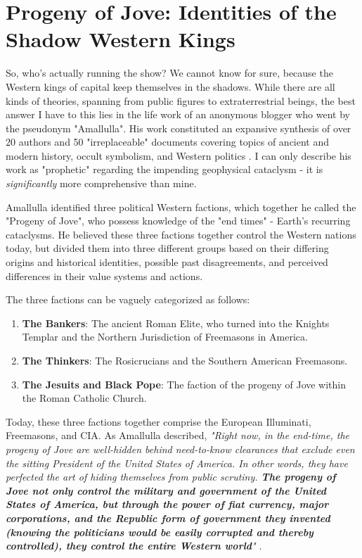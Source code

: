 \documentclass[10pt,twocolumn,letterpaper]{article}
\begin{document}
\section{Progeny of Jove: Identities of the Shadow Western Kings}

So, who's actually running the show? We cannot know for sure, because the Western kings of capital keep themselves in the shadows. While there are all kinds of theories, spanning from public figures to extraterrestrial beings, the best answer I have to this lies in the life work of an anonymous blogger who went by the pseudonym "Amallulla". His work constituted an expansive synthesis of over 20 authors and 50 "irreplaceable" documents covering topics of ancient and modern history, occult symbolism, and Western politics \cite{33,34}. I can only describe his work as "prophetic" regarding the impending geophysical cataclysm - it is \textit{significantly} more comprehensive than mine.

Amallulla identified three political Western factions, which together he called the "Progeny of Jove", who possess knowledge of the "end times" - Earth's recurring cataclysms. He believed these three factions together control the Western nations today, but divided them into three different groups based on their differing origins and historical identities, possible past disagreements, and perceived differences in their value systems and actions.

The three factions can be vaguely categorized as follows:

\begin{flushleft}
\begin{enumerate}
    \item \textbf{The Bankers}: The ancient Roman Elite, who turned into the Knights Templar and the Northern Jurisdiction of Freemasons in America.
    \item \textbf{The Thinkers}: The Rosicrucians and the Southern American Freemasons.
    \item \textbf{The Jesuits and Black Pope}: The faction of the progeny of Jove within the Roman Catholic Church.
\end{enumerate}
\end{flushleft}

Today, these three factions together comprise the European Illuminati, Freemasons, and CIA. As Amallulla described, \textit{"Right now, in the end-time, the progeny of Jove are well-hidden behind need-to-know clearances that exclude even the sitting President of the United States of America. In other words, they have perfected the art of hiding themselves from public scrutiny. \textbf{The progeny of Jove not only control the military and government of the United States of America, but through the power of fiat currency, major corporations, and the Republic form of government they invented (knowing the politicians would be easily corrupted and thereby controlled), they control the entire Western world}"} \cite{33,34}.
\end{document}
